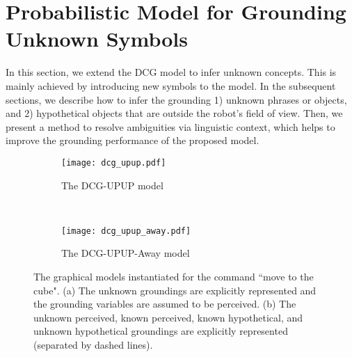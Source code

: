 \section{Probabilistic Model for Grounding Unknown Symbols} \label{sec:technical}

In this section, we extend the DCG model to infer unknown concepts. This is mainly achieved by introducing new symbols to the model. In the subsequent sections, we describe how to infer the grounding 1) unknown phrases or objects, and 2) hypothetical objects that are outside the robot's field of view. Then, we present a method to resolve ambiguities via linguistic context, which helps to improve the grounding performance of the proposed model.

\begin{figure*}
\centering
\begin{subfigure}[t]{0.40\textwidth}
\centering
\texttt{[image: dcg\_upup.pdf]}
\caption{The DCG-UPUP model}
\label{fig:dcg-upup}
\end{subfigure}
~~~~
\begin{subfigure}[t]{0.52\textwidth}
\centering
\texttt{[image: dcg\_upup\_away.pdf]}
\caption{The DCG-UPUP-Away model}
\label{fig:dcg-upup-away}
\end{subfigure}
\caption{The graphical models instantiated for the command ``{move to the cube}". (a) The unknown groundings are explicitly represented and the grounding variables are assumed to be perceived. (b) The unknown perceived, known perceived, known hypothetical, and unknown hypothetical groundings are explicitly represented (separated by dashed lines).}
\end{figure*}

